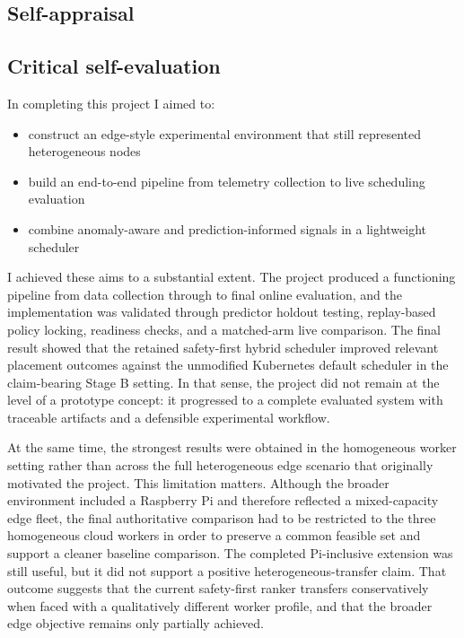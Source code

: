 \begin{appendices}

%
%
\chapter{Self-appraisal}

\section{Critical self-evaluation}

In completing this project I aimed to:

\begin{itemize}
\item construct an edge-style experimental environment that still represented heterogeneous nodes
\item build an end-to-end pipeline from telemetry collection to live scheduling evaluation
\item combine anomaly-aware and prediction-informed signals in a lightweight scheduler
\end{itemize}

I achieved these aims to a substantial extent. The project produced a functioning pipeline from data collection through to final online evaluation, and the implementation was validated through predictor holdout testing, replay-based policy locking, readiness checks, and a matched-arm live comparison. The final result showed that the retained safety-first hybrid scheduler improved relevant placement outcomes against the unmodified Kubernetes default scheduler in the claim-bearing Stage B setting. In that sense, the project did not remain at the level of a prototype concept: it progressed to a complete evaluated system with traceable artifacts and a defensible experimental workflow.

At the same time, the strongest results were obtained in the homogeneous worker setting rather than across the full heterogeneous edge scenario that originally motivated the project. This limitation matters. Although the broader environment included a Raspberry Pi and therefore reflected a mixed-capacity edge fleet, the final authoritative comparison had to be restricted to the three homogeneous cloud workers in order to preserve a common feasible set and support a cleaner baseline comparison. The completed Pi-inclusive extension was still useful, but it did not support a positive heterogeneous-transfer claim. That outcome suggests that the current safety-first ranker transfers conservatively when faced with a qualitatively different worker profile, and that the broader edge objective remains only partially achieved.


\end{appendices}
